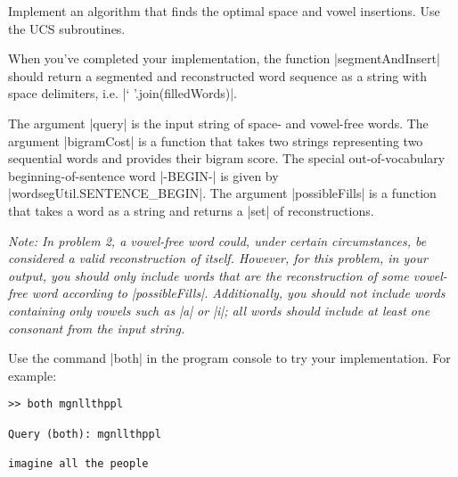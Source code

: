 \item {}
Implement an algorithm that finds the optimal space and vowel insertions.  Use
the UCS subroutines.

When you've completed your implementation, the function |segmentAndInsert|
should return a segmented and reconstructed word sequence as a string with space
delimiters, i.e. |` '.join(filledWords)|.

The argument |query| is the input string of space- and vowel-free words.  The
argument |bigramCost| is a function that takes two strings representing two
sequential words and provides their bigram score.  The special out-of-vocabulary
beginning-of-sentence word |-BEGIN-| is given by |wordsegUtil.SENTENCE_BEGIN|.
The argument |possibleFills| is a function that takes a word as a string and
returns a |set| of reconstructions.

{\em Note: In problem 2, a vowel-free word could, under certain circumstances,
be considered a valid reconstruction of itself. However, for this problem, in
your output, you should only include words that are the reconstruction of some
vowel-free word according to |possibleFills|.  Additionally, you should not
include words containing only vowels such as |a| or |i|; all words should
include at least one consonant from the input string.

Use the command |both| in the program console to try your implementation.  For
example:
\begin{lstlisting}
>> both mgnllthppl

Query (both): mgnllthppl

imagine all the people
\end{lstlisting}}